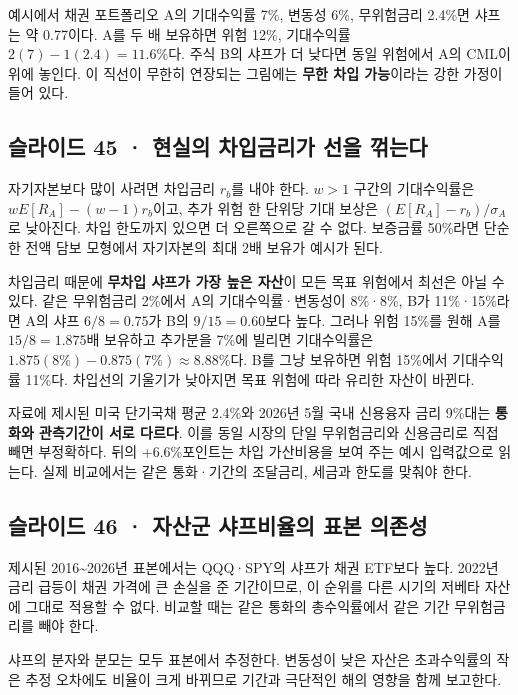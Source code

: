 \documentclass[11pt,a4paper]{article}
\begin{document}
예시에서 채권 포트폴리오 A의 기대수익률 7\%, 변동성 6\%, 무위험금리 2.4\%면 샤프는 약 0.77이다. A를 두 배 보유하면 위험 12\%, 기대수익률 $2(7)-1(2.4)=11.6\%$다. 주식 B의 샤프가 더 낮다면 동일 위험에서 A의 CML이 위에 놓인다. 이 직선이 무한히 연장되는 그림에는 \textbf{무한 차입 가능}이라는 강한 가정이 들어 있다.\par

\subsection{슬라이드 45 · 현실의 차입금리가 선을 꺾는다}
자기자본보다 많이 사려면 차입금리 $r_b$를 내야 한다. $w>1$ 구간의 기대수익률은 $wE[R_A]-(w-1)r_b$이고, 추가 위험 한 단위당 기대 보상은 $(E[R_A]-r_b)/\sigma_A$로 낮아진다. 차입 한도까지 있으면 더 오른쪽으로 갈 수 없다. 보증금률 50\%라면 단순한 전액 담보 모형에서 자기자본의 최대 2배 보유가 예시가 된다.\par

차입금리 때문에 \textbf{무차입 샤프가 가장 높은 자산}이 모든 목표 위험에서 최선은 아닐 수 있다. 같은 무위험금리 2\%에서 A의 기대수익률·변동성이 8\%·8\%, B가 11\%·15\%라면 A의 샤프 $6/8=0.75$가 B의 $9/15=0.60$보다 높다. 그러나 위험 15\%를 원해 A를 $15/8=1.875$배 보유하고 추가분을 7\%에 빌리면 기대수익률은 $1.875(8\%)-0.875(7\%)\approx8.88\%$다. B를 그냥 보유하면 위험 15\%에서 기대수익률 11\%다. 차입선의 기울기가 낮아지면 목표 위험에 따라 유리한 자산이 바뀐다.\par

자료에 제시된 미국 단기국채 평균 2.4\%와 2026년 5월 국내 신용융자 금리 9\%대는 \textbf{통화와 관측기간이 서로 다르다}. 이를 동일 시장의 단일 무위험금리와 신용금리로 직접 빼면 부정확하다. 뒤의 +6.6\%포인트는 차입 가산비용을 보여 주는 예시 입력값으로 읽는다. 실제 비교에서는 같은 통화·기간의 조달금리, 세금과 한도를 맞춰야 한다.\par

\subsection{슬라이드 46 · 자산군 샤프비율의 표본 의존성}
제시된 2016\~{}2026년 표본에서는 QQQ·SPY의 샤프가 채권 ETF보다 높다. 2022년 금리 급등이 채권 가격에 큰 손실을 준 기간이므로, 이 순위를 다른 시기의 저베타 자산에 그대로 적용할 수 없다. 비교할 때는 같은 통화의 총수익률에서 같은 기간 무위험금리를 빼야 한다.\par

샤프의 분자와 분모는 모두 표본에서 추정한다. 변동성이 낮은 자산은 초과수익률의 작은 추정 오차에도 비율이 크게 바뀌므로 기간과 극단적인 해의 영향을 함께 보고한다.\par
\end{document}
